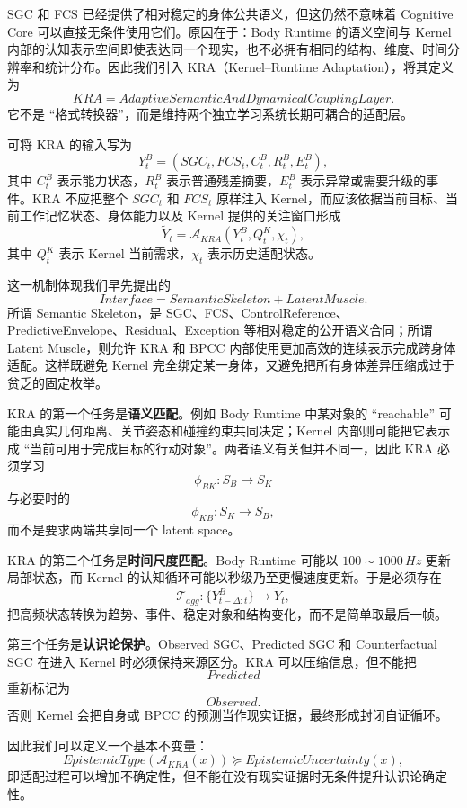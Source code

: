 SGC 和 FCS 已经提供了相对稳定的身体公共语义，但这仍然不意味着 Cognitive Core 可以直接无条件使用它们。原因在于：Body Runtime 的语义空间与 Kernel 内部的认知表示空间即使表达同一个现实，也不必拥有相同的结构、维度、时间分辨率和统计分布。因此我们引入 KRA（Kernel--Runtime Adaptation），将其定义为
\[
\boxed{
KRA
=
AdaptiveSemanticAndDynamicalCouplingLayer .
}
\]
它不是 ``格式转换器''，而是维持两个独立学习系统长期可耦合的适配层。

可将 KRA 的输入写为
\[
Y^B_t
=
\left(
SGC_t,
FCS_t,
C^B_t,
R^B_t,
E^B_t
\right),
\]
其中 $C^B_t$ 表示能力状态，$R^B_t$ 表示普通残差摘要，$E^B_t$ 表示异常或需要升级的事件。KRA 不应把整个 $SGC_t$ 和 $FCS_t$ 原样注入 Kernel，而应该依据当前目标、当前工作记忆状态、身体能力以及 Kernel 提供的关注窗口形成
\[
\tilde Y_t
=
\mathcal A_{KRA}
\left(
Y^B_t,
Q^K_t,
\chi_t
\right),
\]
其中 $Q^K_t$ 表示 Kernel 当前需求，$\chi_t$ 表示历史适配状态。

这一机制体现我们早先提出的
\[
\boxed{
Interface=SemanticSkeleton+LatentMuscle .
}
\]
所谓 Semantic Skeleton，是 SGC、FCS、ControlReference、PredictiveEnvelope、Residual、Exception 等相对稳定的公开语义合同；所谓 Latent Muscle，则允许 KRA 和 BPCC 内部使用更加高效的连续表示完成跨身体适配。这样既避免 Kernel 完全绑定某一身体，又避免把所有身体差异压缩成过于贫乏的固定枚举。

KRA 的第一个任务是\textbf{语义匹配}。例如 Body Runtime 中某对象的 ``reachable'' 可能由真实几何距离、关节姿态和碰撞约束共同决定；Kernel 内部则可能把它表示成 ``当前可用于完成目标的行动对象''。两者语义有关但并不同一，因此 KRA 必须学习
\[
\phi_{BK}:S_B\rightarrow S_K
\]
与必要时的
\[
\phi_{KB}:S_K\rightarrow S_B ,
\]
而不是要求两端共享同一个 latent space。

KRA 的第二个任务是\textbf{时间尺度匹配}。Body Runtime 可能以 $100\sim1000\,Hz$ 更新局部状态，而 Kernel 的认知循环可能以秒级乃至更慢速度更新。于是必须存在
\[
\mathcal T_{agg}:
\{Y^B_{t-\Delta:t}\}
\rightarrow
\tilde Y_t ,
\]
把高频状态转换为趋势、事件、稳定对象和结构变化，而不是简单取最后一帧。

第三个任务是\textbf{认识论保护}。Observed SGC、Predicted SGC 和 Counterfactual SGC 在进入 Kernel 时必须保持来源区分。KRA 可以压缩信息，但不能把
\[
Predicted
\]
重新标记为
\[
Observed .
\]
否则 Kernel 会把自身或 BPCC 的预测当作现实证据，最终形成封闭自证循环。

因此我们可以定义一个基本不变量：
\[
\boxed{
EpistemicType
\left(
\mathcal A_{KRA}(x)
\right)
\succeq
EpistemicUncertainty(x) ,
}
\]
即适配过程可以增加不确定性，但不能在没有现实证据时无条件提升认识论确定性。

